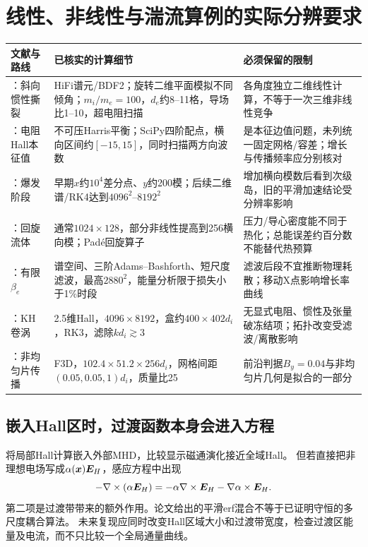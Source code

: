 \documentclass[UTF8,a4paper,11pt,openany,fontset=fandol]{ctexbook}
\begin{document}
\section{线性、非线性与湍流算例的实际分辨要求}
\begin{longtable}{P{29mm}P{64mm}P{55mm}}
\toprule 文献与路线 & 已核实的计算细节 & 必须保留的限制\\\midrule\endhead
\citet{L224}：斜向惯性撕裂 & HiFi谱元/BDF2；旋转二维平面模拟不同倾角；$m_i/m_e=100$，$d_e$约8--11格，导场比1--10，超电阻扫描 & 各角度独立二维线性计算，不等于一次三维非线性竞争\\
\citet{L268}：电阻Hall本征值 & 不可压Harris平衡；SciPy四阶配点，横向区间约$[-15,15]$，同时扫描两方向波数 & 是本征边值问题，未列统一固定网格/容差；增长与传播频率应分别核对\\
\citet{L191,L214,F697}：爆发阶段 & 早期$x$约$10^4$差分点、$y$约200模；后续二维谱/RK4达到$4096^2$--$8192^2$ & 增加横向模数后看到次级岛，旧的平滑加速结论受分辨率影响\\
\citet{E471,E472}：回旋流体 & 通常$1024\times128$，部分非线性提高到256横向模；Padé回旋算子 & 压力/导心密度能不同于热化；总能误差约百分数不能替代热预算\\
\citet{E474}：有限$\beta_e$ & 谱空间、三阶Adams--Bashforth、短尺度滤波，最高$2880^2$，能量分析限于损失小于1\%时段 & 滤波后段不宜推断物理耗散；移动X点影响增长率曲线\\
\citet{F644}：KH卷涡 & 2.5维Hall，$4096\times8192$，盒约$400\times402d_i$，RK3，滤除$kd_i\gtrsim3$ & 无显式电阻、惯性及张量破冻结项；拓扑改变受滤波/离散影响\\
\citet{L294}：非均匀片传播 & F3D，$102.4\times51.2\times256d_i$，网格间距$(0.05,0.05,1)d_i$，质量比25 & 前沿判据$B_y=0.04$与非均匀片几何是拟合的一部分\\
\bottomrule
\end{longtable}

\subsection{嵌入Hall区时，过渡函数本身会进入方程}
\citet{L035}将局部Hall计算嵌入外部MHD，比较显示磁通演化接近全域Hall。
但若直接把非理想电场写成$\alpha(\bm{x})\bm{E}_H$，感应方程中出现
\begin{equation}
 -\nabla\times(\alpha\bm{E}_H)=-\alpha\nabla\times\bm{E}_H-\nabla\alpha\times\bm{E}_H.
\end{equation}
第二项是过渡带带来的额外作用。论文给出的平滑erf混合不等于已证明守恒的多尺度耦合算法。
未来复现应同时改变Hall区域大小和过渡带宽度，检查过渡区能量及电流，而不只比较一个全局通量曲线。
\end{document}
